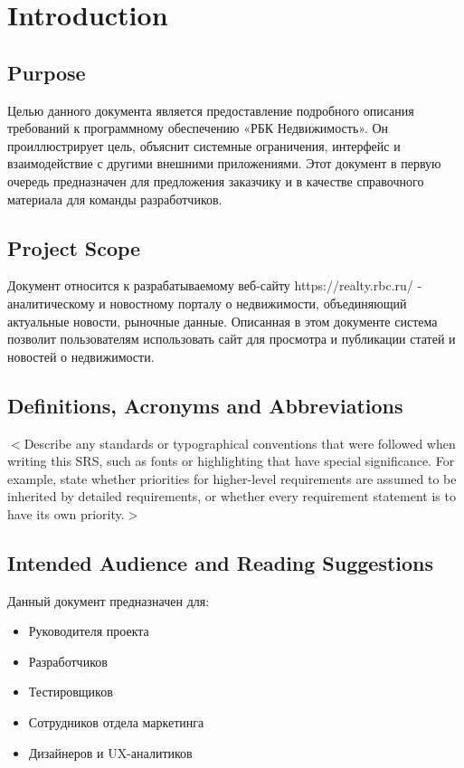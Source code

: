 \documentclass{scrreprt}
\date{}
\begin{document}
\tableofcontents

\chapter{Introduction}

\section{Purpose}
Целью данного документа является предоставление подробного описания требований к программному обеспечению «РБК Недвижимость». Он проиллюстрирует цель, объяснит системные ограничения, интерфейс и взаимодействие с другими
внешними приложениями. Этот документ в первую очередь предназначен для предложения заказчику и в качестве справочного материала для команды разработчиков.

\section{Project Scope}
Документ относится к разрабатываемому веб-сайту https://realty.rbc.ru/ - аналитическому и новостному порталу о недвижимости, объединяющий актуальные новости, рыночные данные. Описанная в этом документе система позволит пользователям использовать сайт для просмотра и публикации статей и новостей о недвижимости.

\section{Definitions, Acronyms and Abbreviations}
$<$Describe any standards or typographical conventions that were followed when 
writing this SRS, such as fonts or highlighting that have special significance.  
For example, state whether priorities  for higher-level requirements are assumed 
to be inherited by detailed requirements, or whether every requirement statement 
is to have its own priority.$>$

\section{Intended Audience and Reading Suggestions}
Данный документ предназначен для:
\begin{itemize}
	\item Руководителя проекта
	\item Разработчиков
	\item Тестировщиков
	\item Сотрудников отдела маркетинга
	\item Дизайнеров и UX-аналитиков
\end{itemize}
\end{document}
